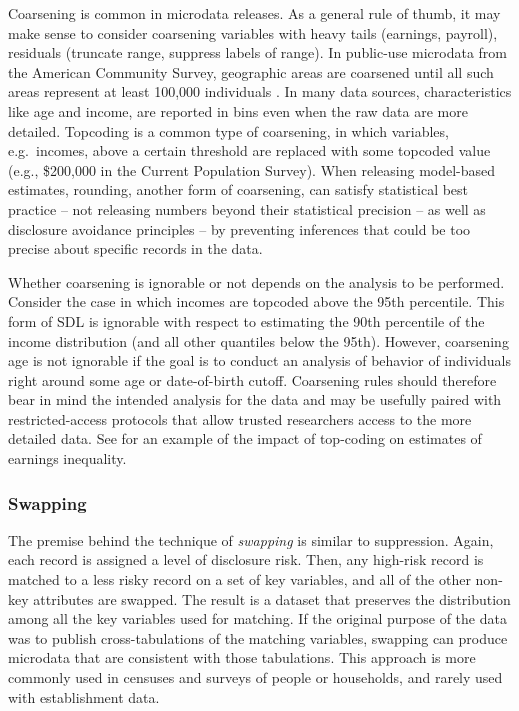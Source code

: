 \documentclass[
]{WileySix}
\begin{document}
Coarsening is common in microdata releases. As a general rule of thumb, it may make sense to consider coarsening variables with heavy tails (earnings, payroll), residuals (truncate range, suppress labels of range).
In public-use microdata from the American Community Survey, geographic areas are coarsened until all such areas represent at least 100,000 individuals \citep{us_census_bureau_finalpublic_2011}. In many data sources, characteristics like age and income, are reported in bins even when the raw data are more detailed. Topcoding is a common type of coarsening, in which variables, e.g.~incomes, above a certain threshold are replaced with some topcoded value (e.g., \$200,000 in the Current Population Survey). When releasing model-based estimates, rounding, another form of coarsening, can satisfy statistical best practice -- not releasing numbers beyond their statistical precision -- as well as disclosure avoidance principles -- by preventing inferences that could be too precise about specific records in the data.

Whether coarsening is ignorable or not depends on the analysis to be performed. Consider the case in which incomes are topcoded above the 95th percentile. This form of SDL is ignorable with respect to estimating the 90th percentile of the income distribution (and all other quantiles below the 95th). However, coarsening age is not ignorable if the goal is to conduct an analysis of behavior of individuals right around some age or date-of-birth cutoff. Coarsening rules should therefore bear in mind the intended analysis for the data and may be usefully paired with restricted-access protocols that allow trusted researchers access to the more detailed data. See \citet{burkhauser_estimating_2011} for an example of the impact of top-coding on estimates of earnings inequality.

\hypertarget{swapping}{%
\subsubsection{Swapping}\label{swapping}}

The premise behind the technique of \emph{swapping} is similar to suppression. Again, each record is assigned a level of disclosure risk. Then, any high-risk record is matched to a less risky record on a set of key variables, and all of the other non-key attributes are swapped. The result is a dataset that preserves the distribution among all the key variables used for matching.
If the original purpose of the data was to publish cross-tabulations of the matching variables, swapping can produce microdata that are consistent with those tabulations.
This approach is more commonly used in censuses and surveys of people or households, and rarely used with establishment data.
\end{document}
